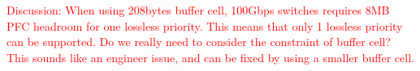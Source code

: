 {\textcolor{red}{Discussion: When using 208bytes buffer cell, 100Gbps switches requires 8MB PFC headroom for one lossless priority. This means that only 1 lossless priority can be supported. Do we really need to consider the constraint of buffer cell? This sounds like an engineer issue, and can be fixed by using a smaller buffer cell.}



%
%
%
%

%
%

}
